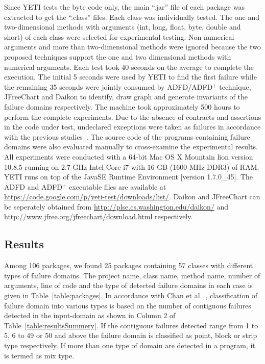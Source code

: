 Since YETI tests the byte code only, the main ``.jar'' file of each package was extracted to get the ``.class'' files. Each class was individually tested. The one and two-dimensional methods with arguments (int, long, float, byte, double and short) of each class were selected for experimental testing. Non-numerical arguments and more than two-dimensional methods were ignored because the two proposed techniques support the one and two dimensional methods with numerical arguments. Each test took 40 seconds on the average to complete the execution. The initial 5 seconds were used by YETI to find the first failure while the remaining 35 seconds were jointly consumed by ADFD/ADFD$^+$ technique, JFreeChart and Daikon to identify, draw graph and generate invariants of the failure domains respectively. The machine took approximately 500 hours to perform the complete experiments. Due to the absence of contracts and assertions in the code under test, undeclared exceptions were taken as failures in accordance with the previous studies~\cite{oriol2012random, ahmad2013adfd}. The source code of the programs containing failure domains were also evaluated manually to cross-examine the experimental results. All experiments were conducted with a 64-bit Mac OS X Mountain lion version 10.8.5 running on 2.7 GHz Intel Core i7 with 16 GB (1600 MHz DDR3) of RAM. YETI runs on top of the Java\texttrademark  SE Runtime Environment [version 1.7.0\_45]. The ADFD and ADFD$^+$ executable files are available at \url{https://code.google.com/p/yeti-test/downloads/list/}. Daikon and JFreeChart can be seperately obtained from \url{http://plse.cs.washington.edu/daikon/} and \url{http://www.jfree.org/jfreechart/download.html} respectively. 



\subsection{Results}
Among 106 packages, we found 25 packages containing 57 classes with different types of failure domains. The project name, class name, method name, number of arguments, line of code and the type of detected failure domains in each case is given in Table~\ref{table:packages}. In accordance with  Chan et al.~\cite{chan1996proportional}, classification of failure domain into various types is based on the number of contiguous failures detected in the input-domain as shown in Column 2 of Table~\ref{table:resultsSummery}. If the contiguous failures detected range from 1 to 5, 6 to 49 or 50 and above the failure domain is classified as point, block or strip type respectively. If more than one type of domain are detected in a program, it is termed as mix type.

